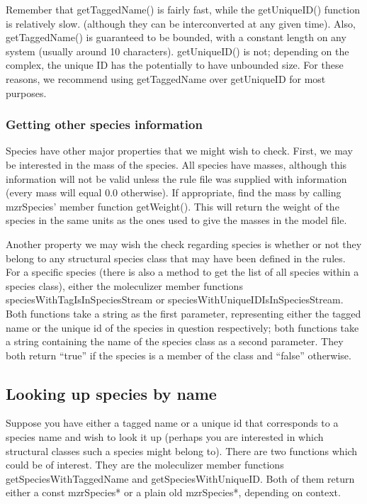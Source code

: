 Remember that getTaggedName() is fairly fast, while the
getUniqueID() function is relatively slow.  (although they can be
interconverted at any given time).  Also, getTaggedName() is
guaranteed to be bounded, with a constant length on any system
(usually around 10 characters).  getUniqueID() is not; depending on
the complex, the unique ID has the potentially to have unbounded
size.  For these reasons, we recommend using getTaggedName over
getUniqueID for most purposes.  

\subsubsection{Getting other species information}

Species have other major properties that we might wish to check.
First, we may be interested in the mass of the species.  All species
have masses, although this information will not be valid unless the
rule file was supplied with information (every mass will equal 0.0
otherwise).  If appropriate, find the mass by calling mzrSpecies'
member function getWeight().  This will return the weight of the
species in the same units as the ones used to give the masses in the
model file.  

Another property we may wish the check regarding species is whether or
not they belong to any structural species class that may have been
defined in the rules.  For a specific species (there is also a method
to get the list of all species within a species class), either the
moleculizer member functions speciesWithTagIsInSpeciesStream or
speciesWithUniqueIDIsInSpeciesStream.  Both functions take a string as
the first parameter, representing either the tagged name or the unique
id of the species in question respectively; both functions take a
string containing the name of the species class as a second
parameter.  They both return ``true'' if the species is a member of
the class and ``false'' otherwise.  

\subsection{Looking up species by name}
Suppose you have either a tagged name or a unique id that corresponds
to a species name and wish to look it up (perhaps you are interested
in which structural classes such a species might belong to).  There
are two functions which could be of interest.  They are the
moleculizer member functions getSpeciesWithTaggedName and
getSpeciesWithUniqueID.  Both of them return either a const
mzrSpecies* or a plain old mzrSpecies*, depending on context.

